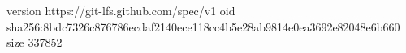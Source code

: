 version https://git-lfs.github.com/spec/v1
oid sha256:8bdc7326c876786ecdaf2140ece118cc4b5e28ab9814e0ea3692e82048e6b660
size 337852
